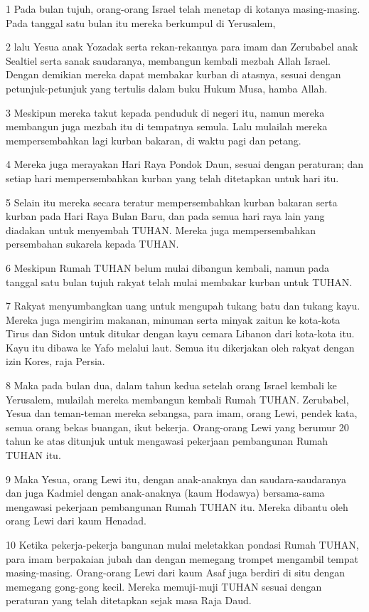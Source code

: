\par 1 Pada bulan tujuh, orang-orang Israel telah menetap di kotanya masing-masing. Pada tanggal satu bulan itu mereka berkumpul di Yerusalem,
\par 2 lalu Yesua anak Yozadak serta rekan-rekannya para imam dan Zerubabel anak Sealtiel serta sanak saudaranya, membangun kembali mezbah Allah Israel. Dengan demikian mereka dapat membakar kurban di atasnya, sesuai dengan petunjuk-petunjuk yang tertulis dalam buku Hukum Musa, hamba Allah.
\par 3 Meskipun mereka takut kepada penduduk di negeri itu, namun mereka membangun juga mezbah itu di tempatnya semula. Lalu mulailah mereka mempersembahkan lagi kurban bakaran, di waktu pagi dan petang.
\par 4 Mereka juga merayakan Hari Raya Pondok Daun, sesuai dengan peraturan; dan setiap hari mempersembahkan kurban yang telah ditetapkan untuk hari itu.
\par 5 Selain itu mereka secara teratur mempersembahkan kurban bakaran serta kurban pada Hari Raya Bulan Baru, dan pada semua hari raya lain yang diadakan untuk menyembah TUHAN. Mereka juga mempersembahkan persembahan sukarela kepada TUHAN.
\par 6 Meskipun Rumah TUHAN belum mulai dibangun kembali, namun pada tanggal satu bulan tujuh rakyat telah mulai membakar kurban untuk TUHAN.
\par 7 Rakyat menyumbangkan uang untuk mengupah tukang batu dan tukang kayu. Mereka juga mengirim makanan, minuman serta minyak zaitun ke kota-kota Tirus dan Sidon untuk ditukar dengan kayu cemara Libanon dari kota-kota itu. Kayu itu dibawa ke Yafo melalui laut. Semua itu dikerjakan oleh rakyat dengan izin Kores, raja Persia.
\par 8 Maka pada bulan dua, dalam tahun kedua setelah orang Israel kembali ke Yerusalem, mulailah mereka membangun kembali Rumah TUHAN. Zerubabel, Yesua dan teman-teman mereka sebangsa, para imam, orang Lewi, pendek kata, semua orang bekas buangan, ikut bekerja. Orang-orang Lewi yang berumur 20 tahun ke atas ditunjuk untuk mengawasi pekerjaan pembangunan Rumah TUHAN itu.
\par 9 Maka Yesua, orang Lewi itu, dengan anak-anaknya dan saudara-saudaranya dan juga Kadmiel dengan anak-anaknya (kaum Hodawya) bersama-sama mengawasi pekerjaan pembangunan Rumah TUHAN itu. Mereka dibantu oleh orang Lewi dari kaum Henadad.
\par 10 Ketika pekerja-pekerja bangunan mulai meletakkan pondasi Rumah TUHAN, para imam berpakaian jubah dan dengan memegang trompet mengambil tempat masing-masing. Orang-orang Lewi dari kaum Asaf juga berdiri di situ dengan memegang gong-gong kecil. Mereka memuji-muji TUHAN sesuai dengan peraturan yang telah ditetapkan sejak masa Raja Daud.
